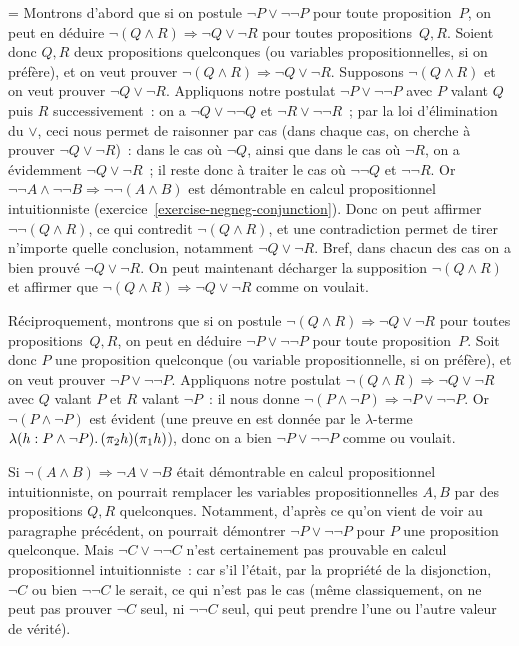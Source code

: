 \documentclass[12pt,a4paper]{article}
\theoremstyle{definition}
\newif\ifcorrige
\newenvironment{corrige}%
{\ifcorrige\relax\else\setbox0=\vbox\bgroup\fi%
\smallbreak\footnotesize\noindent{\underbar{\textit{Corrigé.}}\quad}}
{{\hbox{}\nobreak\hfill\checkmark}%
\ifcorrige\relax\else\egroup\fi\par}
\begin{document}
\begin{corrige}
Montrons d'abord que si on postule $\neg P \lor \neg\neg P$ pour toute
proposition $P$, on peut en déduire $\neg (Q\land R) \Rightarrow \neg
Q \lor \neg R$ pour toutes propositions $Q,R$.  Soient donc $Q,R$ deux
propositions quelconques (ou variables propositionnelles, si on
préfère), et on veut prouver $\neg (Q\land R) \Rightarrow \neg Q \lor
\neg R$.  Supposons $\neg (Q\land R)$ et on veut prouver $\neg Q \lor
\neg R$.  Appliquons notre postulat $\neg P \lor \neg\neg P$ avec $P$
valant $Q$ puis $R$ successivement : on a $\neg Q \lor \neg\neg Q$ et
$\neg R \lor \neg\neg R$ ; par la loi d'élimination du $\lor$, ceci
nous permet de raisonner par cas (dans chaque cas, on cherche à
prouver $\neg Q \lor \neg R$) : dans le cas où $\neg Q$, ainsi que
dans le cas où $\neg R$, on a évidemment $\neg Q \lor \neg R$ ; il
reste donc à traiter le cas où $\neg\neg Q$ et $\neg\neg R$.  Or
$\neg\neg A \land \neg\neg B \Rightarrow \neg\neg (A\land B)$ est
démontrable en calcul propositionnel intuitionniste
(exercice \ref{exercise-negneg-conjunction}).  Donc on peut affirmer
$\neg\neg (Q\land R)$, ce qui contredit $\neg (Q\land R)$, et une
contradiction permet de tirer n'importe quelle conclusion, notamment
$\neg Q \lor \neg R$.  Bref, dans chacun des cas on a bien prouvé
$\neg Q \lor \neg R$.  On peut maintenant décharger la supposition
$\neg (Q\land R)$ et affirmer que $\neg (Q\land R) \Rightarrow \neg Q
\lor \neg R$ comme on voulait.

Réciproquement, montrons que si on postule $\neg (Q\land R)
\Rightarrow \neg Q \lor \neg R$ pour toutes propositions $Q,R$, on
peut en déduire $\neg P \lor \neg\neg P$ pour toute proposition $P$.
Soit donc $P$ une proposition quelconque (ou variable
propositionnelle, si on préfère), et on veut prouver $\neg P \lor
\neg\neg P$.  Appliquons notre postulat $\neg (Q\land R) \Rightarrow
\neg Q \lor \neg R$ avec $Q$ valant $P$ et $R$ valant $\neg P$ : il
nous donne $\neg (P\land \neg P) \Rightarrow \neg P \lor \neg\neg P$.
Or $\neg (P\land \neg P)$ est évident (une preuve en est donnée par le
$\lambda$-terme $\lambda(h:P\land\neg P). \penalty0\, (\pi_2 h)(\pi_1
h)$), donc on a bien $\neg P \lor \neg\neg P$ comme ou voulait.

Si $\neg (A\land B) \Rightarrow \neg A \lor \neg B$ était démontrable
en calcul propositionnel intuitionniste, on pourrait remplacer les
variables propositionnelles $A,B$ par des propositions $Q,R$
quelconques.  Notamment, d'après ce qu'on vient de voir au paragraphe
précédent, on pourrait démontrer $\neg P \lor \neg\neg P$ pour $P$ une
proposition quelconque.  Mais $\neg C \lor \neg\neg C$ n'est
certainement pas prouvable en calcul propositionnel intuitionniste :
car s'il l'était, par la propriété de la disjonction, $\neg C$ ou bien
$\neg\neg C$ le serait, ce qui n'est pas le cas (même classiquement,
on ne peut pas prouver $\neg C$ seul, ni $\neg\neg C$ seul, qui peut
prendre l'une ou l'autre valeur de vérité).
\end{corrige}
\end{document}
